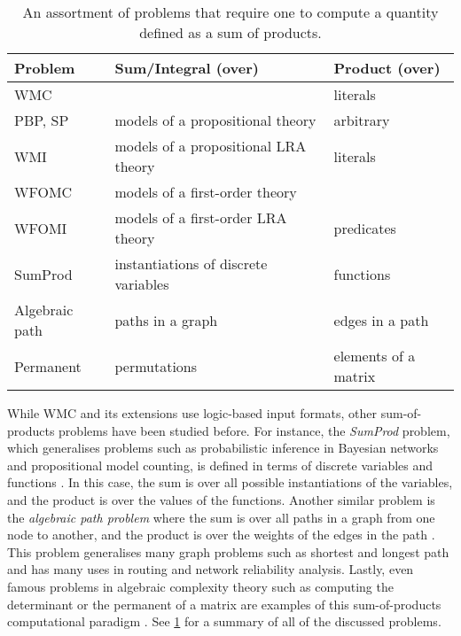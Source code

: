 \begin{table}[t]
  \centering
  \begin{tabular}{lll}
    \toprule
    Problem & Sum/Integral (over) & Product (over) \\
    \midrule
    \rowcolor{gray!10}WMC & & literals \\
    \rowcolor{gray!10}PBP, SP & \multirow{-2}{*}{models of a propositional theory} & arbitrary \\
    WMI & models of a propositional LRA theory & literals \\
    \rowcolor{gray!10}WFOMC & models of a first-order theory & \\
    \rowcolor{gray!10}WFOMI & models of a first-order LRA theory & \multirow{-2}{*}{predicates} \\
    SumProd & instantiations of discrete variables & functions \\
    Algebraic path & paths in a graph & edges in a path \\
    Permanent & permutations & elements of a matrix \\
    \bottomrule
  \end{tabular}
  \caption{An assortment of problems that require one to compute a quantity
    defined as a sum of products.}\label{table:comparison}
\end{table}

While WMC and its extensions use logic-based input formats, other
sum-of-products problems have been studied before. For instance, the
\emph{SumProd} problem, which generalises problems such as probabilistic
inference in Bayesian networks and propositional model counting, is defined in
terms of discrete variables and functions
\citep{DBLP:journals/jair/BacchusDP09,DBLP:journals/ai/Dechter99}. In this case,
the sum is over all possible instantiations of the variables, and the product is
over the values of the functions. Another similar problem is the \emph{algebraic
  path problem} where the sum is over all paths in a graph from one node to
another, and the product is over the weights of the edges in the path
\citep{DBLP:series/synthesis/2010Baras}. This problem generalises many graph
problems such as shortest and longest path and has many uses in routing and
network reliability analysis. Lastly, even famous problems in algebraic
complexity theory such as computing the determinant or the permanent of a matrix
are examples of this sum-of-products computational paradigm
\citep{DBLP:books/daglib/0090316,DBLP:journals/tcs/Valiant79}. See
\cref{table:comparison} for a summary of all of the discussed problems.

